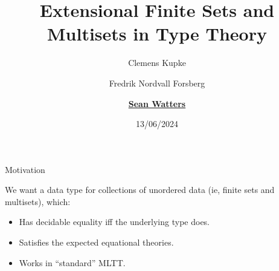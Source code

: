 \documentclass[aspectratio=169]{beamer}
\title[Extenensional Fin. Sets \& Multisets in TT]{Extensional Finite Sets and Multisets in Type Theory}
\author[S. Watters]{Clemens Kupke \and Fredrik Nordvall Forsberg \and \underline{\textbf{Sean Watters}}}
\institute{University of Strathclyde}
\date{13/06/2024}
\newcommand{\xvar}{\AgdaBound{$x$}}
\newcommand{\yvar}{\AgdaBound{$y$}}
\newcommand{\nil}{\AgdaField{$[]$}}
\newcommand{\cons}{\AgdaField{$\dblcolon$}}
\newcommand{\phitm}{\AgdaFunction{$\phi$}}
\newcommand{\datatm}{\AgdaDatatype{Tm}}
\newcommand{\abstm}{\AgdaField{abs}}
\begin{document}
\begin{frame}
  \titlepage{}
\end{frame}

\begin{frame}{Motivation}

  We want a data type for collections of unordered data (ie, finite sets and multisets), which:
  \begin{itemize}
          \smallskip
    \item Has decidable equality iff the underlying type does.
          \smallskip
    \item Satisfies the expected equational theories.
          \smallskip
    \item Works in ``standard'' MLTT.
  \end{itemize}




\end{frame}




\end{document}
